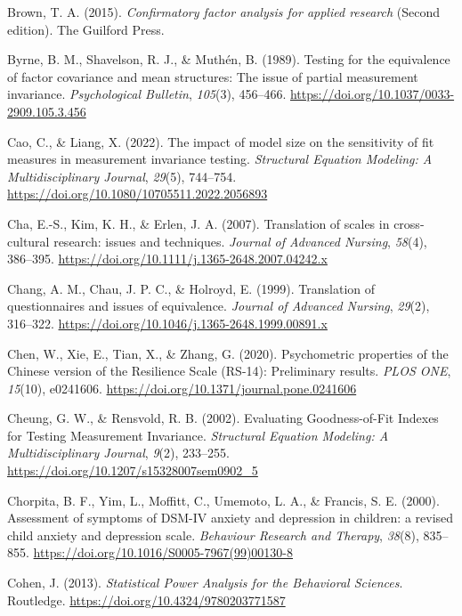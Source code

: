 \documentclass[
  man,floatsintext]{apa7}
\newlength{\cslhangindent}
\newenvironment{CSLReferences}[2] %
 {\begin{list}{}{%
  \setlength{\itemindent}{0pt}
  \setlength{\leftmargin}{0pt}
  \setlength{\parsep}{0pt}
  \ifodd #1
   \setlength{\leftmargin}{\cslhangindent}
   \setlength{\itemindent}{-1\cslhangindent}
  \fi
  \setlength{\itemsep}{#2\baselineskip}}}
 {\end{list}}
\begin{document}
\begin{CSLReferences}{1}{0}
Brown, T. A. (2015). \emph{Confirmatory factor analysis for applied research} (Second edition). The Guilford Press.

Byrne, B. M., Shavelson, R. J., \& Muthén, B. (1989). Testing for the equivalence of factor covariance and mean structures: The issue of partial measurement invariance. \emph{Psychological Bulletin}, \emph{105}(3), 456--466. \url{https://doi.org/10.1037/0033-2909.105.3.456}

Cao, C., \& Liang, X. (2022). The impact of model size on the sensitivity of fit measures in measurement invariance testing. \emph{Structural Equation Modeling: A Multidisciplinary Journal}, \emph{29}(5), 744--754. \url{https://doi.org/10.1080/10705511.2022.2056893}

Cha, E.-S., Kim, K. H., \& Erlen, J. A. (2007). Translation of scales in cross{-}cultural research: issues and techniques. \emph{Journal of Advanced Nursing}, \emph{58}(4), 386--395. \url{https://doi.org/10.1111/j.1365-2648.2007.04242.x}

Chang, A. M., Chau, J. P. C., \& Holroyd, E. (1999). Translation of questionnaires and issues of equivalence. \emph{Journal of Advanced Nursing}, \emph{29}(2), 316--322. \url{https://doi.org/10.1046/j.1365-2648.1999.00891.x}

Chen, W., Xie, E., Tian, X., \& Zhang, G. (2020). Psychometric properties of the Chinese version of the Resilience Scale (RS-14): Preliminary results. \emph{PLOS ONE}, \emph{15}(10), e0241606. \url{https://doi.org/10.1371/journal.pone.0241606}

Cheung, G. W., \& Rensvold, R. B. (2002). Evaluating Goodness-of-Fit Indexes for Testing Measurement Invariance. \emph{Structural Equation Modeling: A Multidisciplinary Journal}, \emph{9}(2), 233--255. \url{https://doi.org/10.1207/s15328007sem0902_5}

Chorpita, B. F., Yim, L., Moffitt, C., Umemoto, L. A., \& Francis, S. E. (2000). Assessment of symptoms of DSM-IV anxiety and depression in children: a revised child anxiety and depression scale. \emph{Behaviour Research and Therapy}, \emph{38}(8), 835--855. \url{https://doi.org/10.1016/S0005-7967(99)00130-8}

Cohen, J. (2013). \emph{Statistical Power Analysis for the Behavioral Sciences}. Routledge. \url{https://doi.org/10.4324/9780203771587}


\end{CSLReferences}
\end{document}
